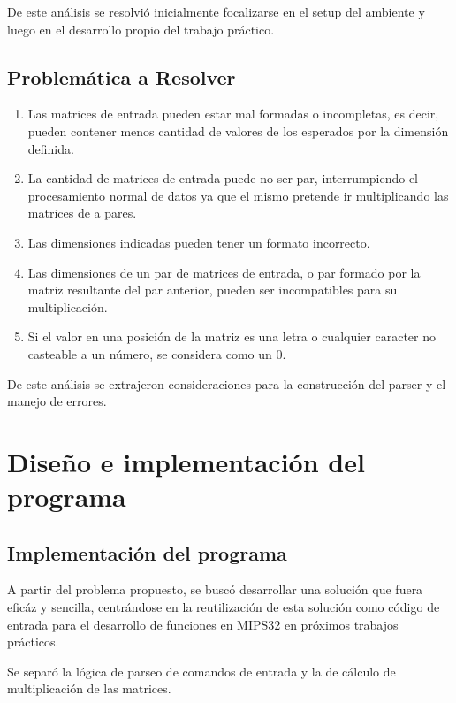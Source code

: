 \documentclass[a4paper,10pt]{article}
\begin{document}
De este an\'alisis se resolvi\'o inicialmente focalizarse en el setup del ambiente y luego en el desarrollo propio del trabajo pr\'actico.

\subsection{Problem\'atica a Resolver}
\begin{enumerate}
\item Las matrices de entrada pueden estar mal formadas o incompletas, es decir, pueden contener menos cantidad de valores de los esperados por la dimensi\'on definida.
\item La cantidad de matrices de entrada puede no ser par, interrumpiendo el procesamiento normal de datos ya que el mismo pretende ir multiplicando las matrices de a pares.
\item Las dimensiones indicadas pueden tener un formato incorrecto.
\item Las dimensiones de un par de matrices de entrada, o par formado por la matriz resultante del par anterior, pueden ser incompatibles para su multiplicaci\'on.
\item Si el valor en una posici\'on de la matriz es una letra o cualquier caracter no casteable a un número, se considera como un 0.
\end{enumerate}

De este an\'alisis se extrajeron consideraciones para la construcci\'on del parser y el manejo de errores.

\newpage

\section{Diseño e implementaci\'on del programa}


\subsection{Implementaci\'on del programa}

A partir del problema propuesto, se busc\'o desarrollar una soluci\'on que fuera efic\'az y sencilla, centr\'andose en la reutilizaci\'on de esta soluci\'on como c\'odigo de entrada para el desarrollo de funciones en MIPS32 en pr\'oximos trabajos pr\'acticos. \par

Se separ\'o la l\'ogica de parseo de comandos de entrada y la de c\'alculo de multiplicaci\'on de las matrices.\par
\end{document}
